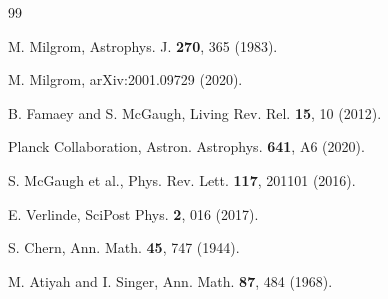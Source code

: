 \documentclass[twocolumn,showpacs,preprintnumbers,amsmath,amssymb,prd]{revtex4-2}
\begin{document}
\begin{thebibliography}{99}

 M. Milgrom, Astrophys. J. \textbf{270}, 365 (1983).

 M. Milgrom, arXiv:2001.09729 (2020).

 B. Famaey and S. McGaugh, Living Rev. Rel. \textbf{15}, 10 (2012).

 Planck Collaboration, Astron. Astrophys. \textbf{641}, A6 (2020).

 S. McGaugh et al., Phys. Rev. Lett. \textbf{117}, 201101 (2016).

 E. Verlinde, SciPost Phys. \textbf{2}, 016 (2017).

 S. Chern, Ann. Math. \textbf{45}, 747 (1944).

 M. Atiyah and I. Singer, Ann. Math. \textbf{87}, 484 (1968).

\end{thebibliography}
\end{document}
